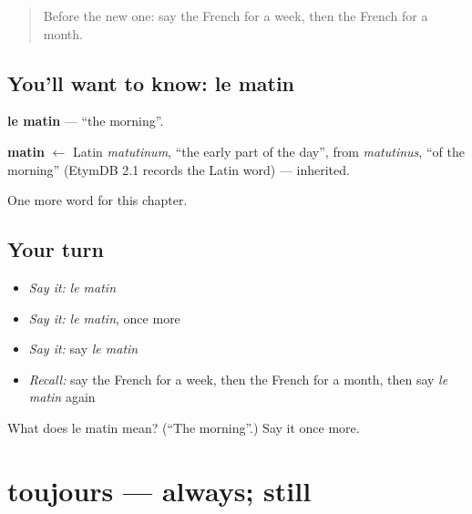\label{lesson:FR-C95-matin}



\begin{quote}
Before the new one: say the French for a week, then the French for a month.
\end{quote}

\subsection*{You'll want to know: le matin}
\textbf{le matin} — \textquotedblleft{}the morning\textquotedblright{}.

\begin{cousinweb}
\textbf{matin} $\leftarrow$ Latin \emph{matutinum}, \textquotedblleft{}the early part of the day\textquotedblright{}, from \emph{matutinus}, \textquotedblleft{}of the morning\textquotedblright{} (EtymDB 2.1 records the Latin word) — inherited.
\end{cousinweb}

\begin{grammarlens}[title={What you've built}]
One more word for this chapter.
\end{grammarlens}

\subsection*{Your turn}
\begin{itemize}
\raggedright
  \item \emph{Say it:} \emph{le matin}
  \item \emph{Say it:} \emph{le matin}, once more
  \item \emph{Say it:} say \emph{le matin}
  \item \emph{Recall:} say the French for a week, then the French for a month, then say \emph{le matin} again
\end{itemize}

\begin{tcolorbox}[breakable,colback=teal!4,colframe=teal!35!black,title={Before you move on}]
What does le matin mean? (\textquotedblleft{}The morning\textquotedblright{}.) Say it once more.
\end{tcolorbox}
\section[toujours]{toujours — always; still}

\label{lesson:FR-C95-toujours}



